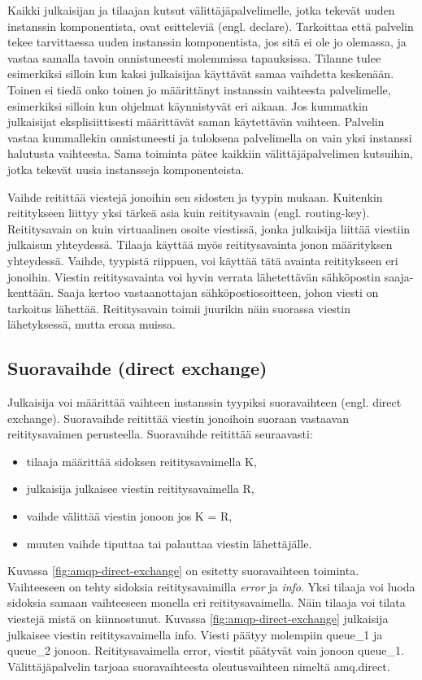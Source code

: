 Kaikki julkaisijan ja tilaajan kutsut välittäjäpalvelimelle, jotka tekevät uuden instanssin komponentista, ovat esitteleviä (engl. declare). Tarkoittaa että palvelin tekee tarvittaessa uuden instanssin komponentista, jos sitä ei ole jo olemassa, ja vastaa samalla tavoin onnistuneesti molemmissa tapauksissa. Tilanne tulee esimerkiksi silloin kun kaksi julkaisijaa käyttävät samaa vaihdetta keskenään. Toinen ei tiedä onko toinen jo määrittänyt instanssin vaihteesta palvelimelle, esimerkiksi silloin kun ohjelmat käynnistyvät eri aikaan. Jos kummatkin julkaisijat eksplisiittisesti määrittävät saman käytettävän vaihteen. Palvelin vastaa kummallekin onnistuneesti ja tuloksena palvelimella on vain yksi instanssi halutusta vaihteesta. Sama toiminta pätee kaikkiin välittäjäpalvelimen kutsuihin, jotka tekevät uusia instansseja komponenteista.

Vaihde reitittää viestejä jonoihin sen sidosten ja tyypin mukaan. Kuitenkin reititykseen liittyy yksi tärkeä asia kuin reititysavain (engl. routing-key). Reititysavain on kuin virtuaalinen osoite viestissä, jonka julkaisija liittää viestiin julkaisun yhteydessä. Tilaaja käyttää myös reititysavainta jonon määrityksen yhteydessä. Vaihde, tyypistä riippuen, voi käyttää tätä avainta reititykseen eri jonoihin. Viestin reititysavainta voi hyvin verrata lähetettävän sähköpostin saaja-kenttään. Saaja kertoo vastaanottajan sähköpostiosoitteen, johon viesti on tarkoitus lähettää. Reititysavain toimii juurikin näin suorassa viestin lähetyksessä, mutta eroaa muissa.


\subsection{Suoravaihde (direct exchange)}
\label{ch:direct-exchange}
Julkaisija voi määrittää vaihteen instanssin tyypiksi suoravaihteen (engl. direct exchange). Suoravaihde reitittää viestin jonoihoin suoraan vastaavan reititysavaimen perusteella. Suoravaihde reitittää seuraavasti:
\begin{itemize}
	\item tilaaja määrittää sidoksen reititysavaimella K,
	\item julkaisija julkaisee viestin reititysavaimella R,
	\item vaihde välittää viestin jonoon jos K = R,
	\item muuten vaihde tiputtaa tai palauttaa viestin lähettäjälle.
\end{itemize}
Kuvassa \ref{fig:amqp-direct-exchange} on esitetty suoravaihteen toiminta. Vaihteeseen on tehty sidoksia reititysavaimilla \emph{error} ja \emph{info}. Yksi tilaaja voi luoda sidoksia samaan vaihteeseen monella eri reititysavaimella. Näin tilaaja voi tilata viestejä mistä on kiinnostunut. Kuvassa \ref{fig:amqp-direct-exchange} julkaisija julkaisee viestin reititysavaimella info. Viesti päätyy molempiin queue\_1 ja queue\_2 jonoon. Reititysavaimella error, viestit päätyvät vain jonoon queue\_1. Välittäjäpalvelin tarjoaa suoravaihteesta oleutusvaihteen nimeltä amq.direct. \cite[s.~27]{AMQP-specification}

